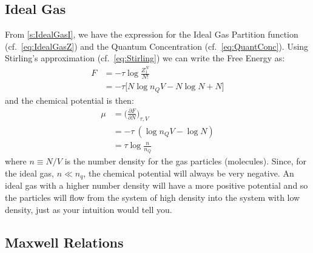 \subsection{Ideal Gas}
From \cref{s:IdealGasI}, we have the expression for the Ideal Gas
Partition function (cf.~\cref{eq:IdealGasZ}) and the Quantum 
Concentration (cf.~\cref{eq:QuantConc}). Using Stirling's 
approximation (cf.~\cref{eq:Stirling}) we can write the Free Energy
as:
\begin{align}
F &= -\tau \log{\frac{Z_{1}^N}{N!}} \\
  &= -\tau \bigg[N \log{n_Q V} - N \log{N} + N \bigg] 
\end{align}
and the chemical potential is then:
\begin{align}
\mu &= \bigg(\frac{\partial F}{\partial N}\bigg)_{\tau,V} \\
    &= -\tau~(\log{n_Q V} - \log{N}) \\
    &= \tau \log{\frac{n}{n_Q}}
\end{align} 
where $n \equiv N/V$ is the number density for the gas 
particles (molecules). Since, for the ideal gas, $n \ll n_q$, the
chemical potential will always be very negative. An ideal gas
with a higher number density will have a more positive potential
and so the particles will flow from the system of high density
into the system with low density, just as your intuition would
tell you.


\subsection{Maxwell Relations}
\label{s:MaxwellRelations}

